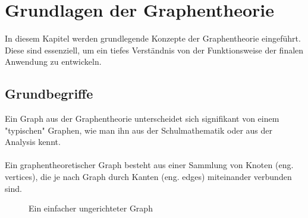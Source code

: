 

\section{Grundlagen der Graphentheorie}
In diesem Kapitel werden grundlegende Konzepte der Graphentheorie eingeführt. Diese sind essenziell, um ein tiefes Verständnis von der Funktionsweise der finalen Anwendung zu entwickeln.

\subsection{Grundbegriffe}
Ein Graph aus der Graphentheorie unterscheidet sich signifikant von einem "typischen" Graphen, wie man ihn aus der Schulmathematik oder aus der Analysis kennt.\\\\
Ein graphentheoretischer Graph besteht aus einer Sammlung von Knoten (eng. vertices), die je nach Graph durch Kanten (eng. edges) miteinander verbunden sind.
\begin{figure}[h]
    \centering
    
    \caption{Ein einfacher ungerichteter Graph}
    \label{g1}
\end{figure}
